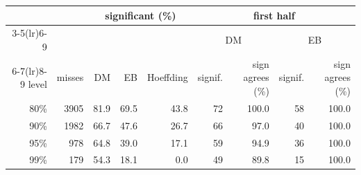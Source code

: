\begin{tabular}{rrrrrrrrr}
\toprule
 & & \multicolumn{3}{c}{significant (\%)} & \multicolumn{4}{c}{first half}\\
\cmidrule(lr){3-5}\cmidrule(lr){6-9}
 & & & & & \multicolumn{2}{c}{DM} & \multicolumn{2}{c}{EB}\\
\cmidrule(lr){6-7}\cmidrule(lr){8-9}
level & misses & DM & EB & Hoeffding & signif. & sign agrees (\%) & signif. & sign agrees (\%)\\
\midrule
80\% & 3905 & 81.9 & 69.5 & 43.8 & 72 & 100.0 & 58 & 100.0\\
90\% & 1982 & 66.7 & 47.6 & 26.7 & 66 & 97.0 & 40 & 100.0\\
95\% & 978 & 64.8 & 39.0 & 17.1 & 59 & 94.9 & 36 & 100.0\\
99\% & 179 & 54.3 & 18.1 & 0.0 & 49 & 89.8 & 15 & 100.0\\
\bottomrule
\end{tabular}
